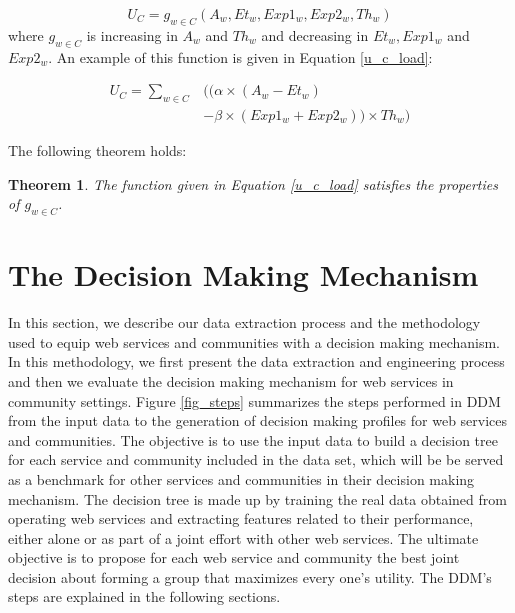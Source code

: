 \documentclass[11pt,onecolumn]{IEEEtran}
\newtheorem{theorem}{Theorem}
\begin{document}
\begin{equation}\label{improved_u_c_general}
U_{C} = g_{w\in C}(A_{w}, Et_{w}, Exp1_{w}, Exp2_{w}, Th_{w})
\end{equation}
%
where $g_{w\in C}$ is increasing in $A_{w}$ and $Th_{w}$ and decreasing in $Et_{w}, Exp1_{w}$ and $Exp2_{w}$. An example of this function is given in Equation \ref{u_c_load}:


\begin{equation}\label{u_c_load}
\begin{split}
U_{C} = \sum_{w \in C}&\bigg(\big(\alpha \times (A_{w} - Et_{w}) \\
        & - \beta \times (Exp1_{w} + Exp2_{w})\big) \times Th_{w}\bigg)
\end{split}
\end{equation}

The following theorem holds:

\begin{theorem}
The function given in Equation \ref{u_c_load} satisfies the properties of $g_{w\in C}$.
\end{theorem} 


\section{The Decision Making Mechanism}\label{s:model}

In this section, we describe our data extraction process and the methodology used to equip web services and communities with a decision making mechanism. In this methodology, we first present the data extraction and engineering process and then we evaluate the decision making mechanism for web services in community settings. Figure \ref{fig_steps} summarizes the steps performed in DDM from the input data to the generation of decision making profiles for web services and communities. The objective is to use the input data to build a decision tree for each service and community included in the data set, which will be be served as a benchmark for other services and communities in their decision making mechanism. The decision tree is made up by training the real data obtained from operating web services and extracting features related to their performance, either alone or as part of a joint effort with other web services. The ultimate objective is to propose for each web service and community the best joint decision about forming a group that maximizes every one's utility. The DDM's steps are explained in the following sections. 
\end{document}

